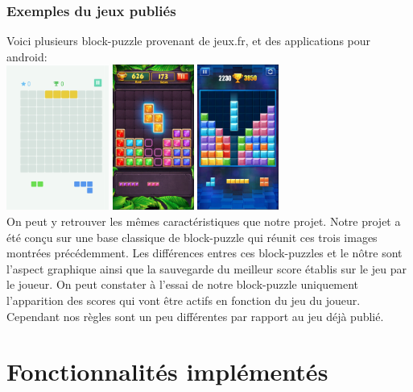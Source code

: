 \documentclass[a4paper]{report}
\begin{document}
\section{Exemples du jeux publiés}
Voici plusieurs block-puzzle provenant de jeux.fr, et des applications pour android: \\
\includegraphics[height=180px]{images/jeuxPublie1.png}
\includegraphics[height=180px]{images/jeuxPublie2.png}
\includegraphics[height=180px]{images/jeuxPublie3.png}\\

On peut y retrouver les mêmes caractéristiques que notre projet. Notre projet a été conçu sur une base classique de block-puzzle qui réunit ces trois images montrées précédemment. Les différences entres ces block-puzzles et le nôtre sont l'aspect graphique ainsi que la sauvegarde du meilleur score établis sur le jeu par le joueur. On peut constater à l'essai de notre block-puzzle uniquement l'apparition des scores qui vont être actifs en fonction du jeu du joueur. Cependant nos règles sont un peu différentes par rapport au jeu déjà publié.
\part{Fonctionnalités implémentés}
\end{document}
